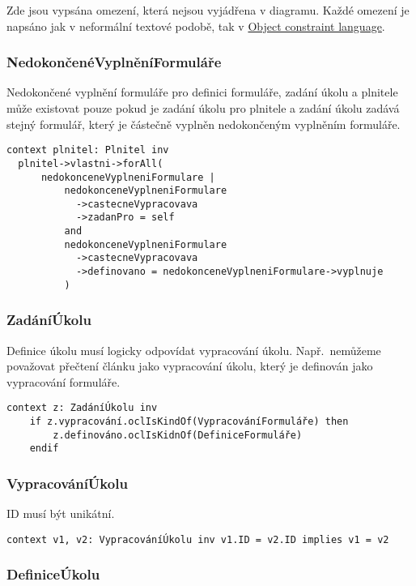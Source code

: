 Zde jsou vypsána omezení, která nejsou vyjádřena v diagramu.
Každé omezení je napsáno jak v neformální textové podobě, tak v \href{https://www.omg.org/spec/OCL/2.4/About-OCL}{Object constraint language}.

\subsubsection{NedokončenéVyplněníFormuláře}

Nedokončené vyplnění formuláře pro definici formuláře, zadání úkolu a plnitele může existovat pouze pokud je zadání úkolu pro plnitele a zadání úkolu zadává stejný formulář, který je částečně vyplněn nedokončeným vyplněním formuláře.

\begin{verbatim}
context plnitel: Plnitel inv
  plnitel->vlastni->forAll(
      nedokonceneVyplneniFormulare |
          nedokonceneVyplneniFormulare
            ->castecneVypracovava
            ->zadanPro = self
          and
          nedokonceneVyplneniFormulare
            ->castecneVypracovava
            ->definovano = nedokonceneVyplneniFormulare->vyplnuje
          )
\end{verbatim}

\subsubsection{ZadáníÚkolu}

Definice úkolu musí logicky odpovídat vypracování úkolu.
Např.\ nemůžeme považovat přečtení článku jako vypracování úkolu, který je definován jako vypracování formuláře.

\begin{verbatim}
context z: ZadáníÚkolu inv
    if z.vypracování.oclIsKindOf(VypracováníFormuláře) then
        z.definováno.oclIsKidnOf(DefiniceFormuláře)
    endif
\end{verbatim}

\subsubsection{VypracováníÚkolu}

ID musí být unikátní.

\begin{verbatim}
context v1, v2: VypracováníÚkolu inv v1.ID = v2.ID implies v1 = v2
\end{verbatim}

\subsubsection{DefiniceÚkolu}

